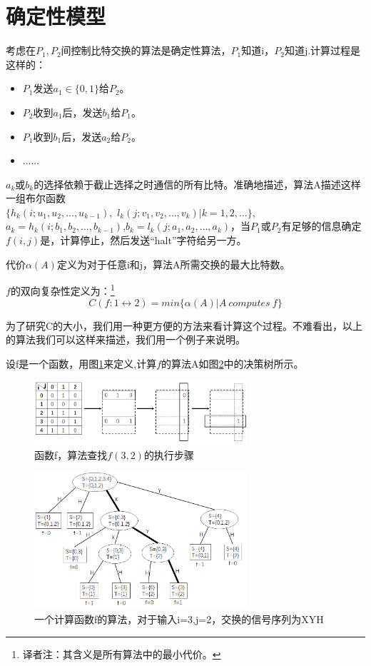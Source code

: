 \documentclass[]{article}
\begin{document}
	\section{确定性模型}
	考虑在$P_1,P_2$间控制比特交换的算法是确定性算法，$P_1$知道i，$P_2$知道j.计算过程是这样的：
	\begin{itemize}
		\item $P_1$发送$a_1\in\{0,1\}$给$P_2$。
		\item $P_2$收到$a_1$后，发送$b_1$给$P_1$。
		\item $P_1$收到$b_1$后，发送$a_2$给$P_2$。
		\item ......
	\end{itemize}
	\par
    $a_k$或$b_k$的选择依赖于截止选择之时通信的所有比特。准确地描述，算法A描述这样一组布尔函数\\
    $\{h_k(i;u_1,u_2,\ldots,u_{k-1}),$ $l_k(j;v_1,v_2,\ldots,v_k) | k=1,2,\ldots \}$,$a_k=h_k(i;b_1,b_2,\ldots,b_{k-1})$,$b_k=l_k(j;a_1,a_2,\ldots,a_k)$，当$P_1$或$P_2$有足够的信息确定$f(i,j)$是，计算停止，然后发送“halt”字符给另一方。\par
    代价$\alpha(A)$定义为对于任意i和j，算法A所需交换的最大比特数。\par
    $f$的双向复杂性定义为：\footnote{译者注：其含义是所有算法中的最小代价。}
    \[C(f:1\leftrightarrow 2)=min\{\alpha(A) | A\ computes\ f\}\]
    \par
    为了研究C的大小，我们用一种更方便的方法来看计算这个过程。不难看出，以上的算法我们可以这样来描述，我们用一个例子来说明。\par
    设f是一个函数，用图\ref{Fig1}来定义,计算$f$的算法A如图\ref{Fig2}中的决策树所示。\par
    \begin{figure}[htbp]
    	\centering
    	\includegraphics[width=0.7\textwidth]{Fig1.png}
    	\caption{函数f，算法查找$f(3,2)$的执行步骤}
    	\label{Fig1}
    \end{figure}

	\begin{figure}[htbp]
		\centering
		\includegraphics[width=0.7\textwidth]{Fig2.png}
		\caption{一个计算函数f的算法，对于输入i=3,j=2，交换的信号序列为XYH}
		\label{Fig2}
	\end{figure}
\end{document}
